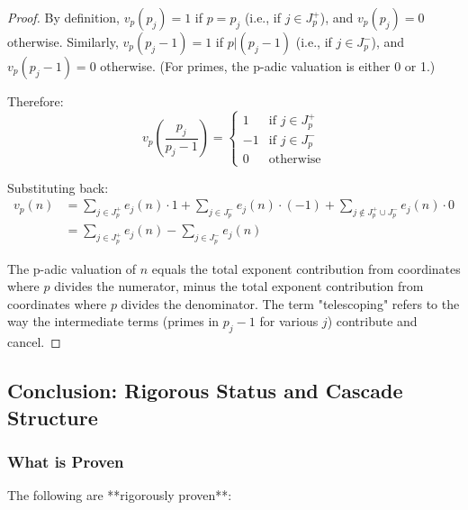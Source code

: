 \begin{proof}
By definition, $v_p(p_j) = 1$ if $p = p_j$ (i.e., if $j \in J_p^+$), and $v_p(p_j) = 0$ otherwise. Similarly, $v_p(p_j - 1) = 1$ if $p | (p_j - 1)$ (i.e., if $j \in J_p^-$), and $v_p(p_j - 1) = 0$ otherwise. (For primes, the p-adic valuation is either 0 or 1.)

Therefore:
\begin{equation}
v_p\left(\frac{p_j}{p_j - 1}\right) = \begin{cases} 1 & \text{if } j \in J_p^+ \\ -1 & \text{if } j \in J_p^- \\ 0 & \text{otherwise} \end{cases}
\end{equation}

Substituting back:
\begin{align}
v_p(n) &= \sum_{j \in J_p^+} e_j(n) \cdot 1 + \sum_{j \in J_p^-} e_j(n) \cdot (-1) + \sum_{j \notin J_p^+ \cup J_p^-} e_j(n) \cdot 0 \\
&= \sum_{j \in J_p^+} e_j(n) - \sum_{j \in J_p^-} e_j(n)
\end{align}

\noindent The p-adic valuation of $n$ equals the total exponent contribution from coordinates where $p$ divides the numerator, minus the total exponent contribution from coordinates where $p$ divides the denominator. The term "telescoping" refers to the way the intermediate terms (primes in $p_j - 1$ for various $j$) contribute and cancel.

\end{proof}

\subsection{Conclusion: Rigorous Status and Cascade Structure}
\label{subsec:foundation-conclusion}

\subsubsection{What is Proven}
\label{subsubsec:proven-statements}

The following are **rigorously proven**:


